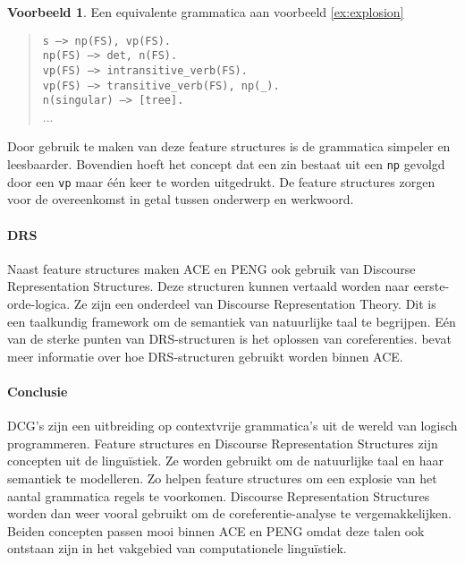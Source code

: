 \documentclass[]{article}
\theoremstyle{definition}
\newtheorem{ex}{Voorbeeld}[section]
\begin{document}
\begin{ex}  Een equivalente grammatica aan voorbeeld \ref{ex:explosion}
  \begin{quote}
    \texttt{s ---> np(FS), vp(FS).} \\
    \texttt{np(FS) ---> det, n(FS).} \\
    \texttt{vp(FS) ---> intransitive\_verb(FS).} \\
    \texttt{vp(FS) ---> transitive\_verb(FS), np(\_).} \\
    \texttt{n(singular) ---> [tree].} \\
    ...
  \end{quote}
\end{ex} 

Door gebruik te maken van deze feature structures is de grammatica simpeler en leesbaarder. Bovendien hoeft het concept dat een zin bestaat uit een \texttt{np} gevolgd door een \texttt{vp} maar één keer te worden uitgedrukt. De feature structures zorgen voor de overeenkomst in getal tussen onderwerp en werkwoord.

\paragraph{DRS} Naast feature structures maken ACE en PENG ook gebruik van Discourse Representation Structures. Deze structuren kunnen vertaald worden naar eerste-orde-logica. Ze zijn een onderdeel van Discourse Representation Theory. Dit is een taalkundig framework om de semantiek van natuurlijke taal te begrijpen. Eén van de sterke punten van DRS-structuren is het oplossen van coreferenties. \cite{Fuchs2008drs} bevat meer informatie over hoe DRS-structuren gebruikt worden binnen ACE.

\paragraph{Conclusie} DCG's zijn een uitbreiding op contextvrije grammatica's uit de wereld van logisch programmeren. Feature structures en Discourse Representation Structures zijn concepten uit de linguïstiek. Ze worden gebruikt om de natuurlijke taal en haar semantiek te modelleren. Zo helpen feature structures om een explosie van het aantal grammatica regels te voorkomen. Discourse Representation Structures worden dan weer vooral gebruikt om de coreferentie-analyse te vergemakkelijken. Beiden concepten passen mooi binnen ACE en PENG omdat deze talen ook ontstaan zijn in het vakgebied van computationele linguïstiek.
\end{document}
